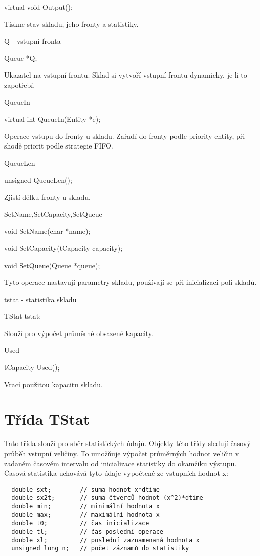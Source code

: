 \documentclass[a4paper]{article}
\begin{document}
  virtual void Output();


Tiskne stav skladu, jeho fronty a statistiky.


Q - vstupní fronta

  Queue *Q;


Ukazatel na vstupní frontu. Sklad si vytvoří vstupní frontu dynamicky,
je-li to zapotřebí.


QueueIn

  virtual int QueueIn(Entity *e);


Operace vstupu do fronty u skladu. Zařadí do fronty podle priority
entity, při shodě priorit podle strategie FIFO.


QueueLen

  unsigned QueueLen();


Zjistí délku fronty u skladu.


SetName,SetCapacity,SetQueue

  void SetName(char *name);

  void SetCapacity(tCapacity capacity);

  void SetQueue(Queue *queue);


Tyto operace nastavují parametry skladu, používají se při inicializaci
polí skladů.


tstat - statistika skladu

  TStat tstat;


Slouží pro výpočet průměrně obsazené kapacity.


Used

  tCapacity Used();


Vrací použitou kapacitu skladu.



\section{Třída TStat}

Tato třída slouží pro sběr statistických údajů. Objekty této třídy
sledují časový průběh vstupní veličiny. To umožňuje výpočet průměrných
hodnot veličin v zadaném časovém intervalu od inicializace statistiky
do okamžiku výstupu. Časová statistika uchovává tyto údaje vypočtené
ze vstupních hodnot x:

\begin{verbatim}
  double sxt;        // suma hodnot x*dtime
  double sx2t;       // suma čtverců hodnot (x^2)*dtime
  double min;        // minimální hodnota x
  double max;        // maximální hodnota x
  double t0;         // čas inicializace
  double tl;         // čas poslední operace
  double xl;         // poslední zaznamenaná hodnota x
  unsigned long n;   // počet záznamů do statistiky
\end{verbatim}
\end{document}
